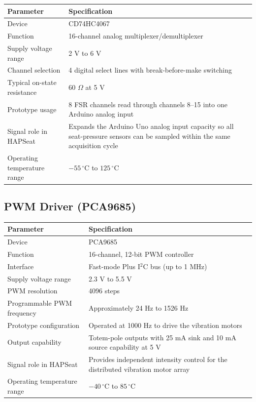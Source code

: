 \documentclass[11pt, a4paper]{article}
\begin{document}
\begin{table}[H]
    \centering
    \footnotesize
    \begin{tabular}{p{} p{}}
        \toprule
        \textbf{Parameter} & \textbf{Specification} \\
        \midrule
        Device & CD74HC4067 \\
        Function & 16-channel analog multiplexer/demultiplexer \\
        Supply voltage range & 2 V to 6 V \\
        Channel selection & 4 digital select lines with break-before-make switching \\
        Typical on-state resistance & 60 $\Omega$ at 5 V \\
        Prototype usage & 8 FSR channels read through channels 8--15 into one Arduino analog input \\
        Signal role in HAPSeat & Expands the Arduino Uno analog input capacity so all seat-pressure sensors can be sampled within the same acquisition cycle \\
        Operating temperature range & $-55\,^{\circ}\text{C}$ to $125\,^{\circ}\text{C}$ \\
        \bottomrule
    \end{tabular}
\end{table}

\subsection{PWM Driver (PCA9685)}
\label{app:PWM_controller}

\begin{table}[H]
    \centering
    \footnotesize
    \begin{tabular}{p{} p{}}
        \toprule
        \textbf{Parameter} & \textbf{Specification} \\
        \midrule
        Device & PCA9685 \\
        Function & 16-channel, 12-bit PWM controller \\
        Interface & Fast-mode Plus I$^2$C bus (up to 1 MHz) \\
        Supply voltage range & 2.3 V to 5.5 V \\
        PWM resolution & 4096 steps \\
        Programmable PWM frequency & Approximately 24 Hz to 1526 Hz \\
        Prototype configuration & Operated at 1000 Hz to drive the vibration motors \\
        Output capability & Totem-pole outputs with 25 mA sink and 10 mA source capability at 5 V \\
        Signal role in HAPSeat & Provides independent intensity control for the distributed vibration motor array \\
        Operating temperature range & $-40\,^{\circ}\text{C}$ to $85\,^{\circ}\text{C}$ \\
        \bottomrule
    \end{tabular}
\end{table}
\end{document}
